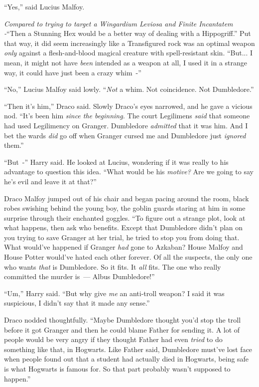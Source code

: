 ``Yes,'' said Lucius Malfoy.

\emph{Compared to trying to target a Wingardium Leviosa and Finite Incantatem -}``Then a Stunning Hex would be a better way of dealing with a Hippogriff.'' Put that way, it did seem increasingly like a Transfigured rock was an optimal weapon \emph{only} against a flesh-and-blood magical creature with spell-resistant skin. ``But... I mean, it might not have \emph{been} intended as a weapon at all, I used it in a strange way, it could have just been a crazy whim~-''

``No,'' Lucius Malfoy said lowly. ``\emph{Not} a whim. Not coincidence. Not Dumbledore.''

``Then it's him,'' Draco said. Slowly Draco's eyes narrowed, and he gave a vicious nod. ``It's been him \emph{since the beginning.} The court Legilimens \emph{said} that someone had used Legilimency on Granger. Dumbledore \emph{admitted} that it was him. And I bet the wards \emph{did} go off when Granger cursed me and Dumbledore just \emph{ignored} them.''

``But~-'' Harry said. He looked at Lucius, wondering if it was really to his advantage to question this idea. ``What would be his \emph{motive?} Are we going to say he's evil and leave it at that?''

Draco Malfoy jumped out of his chair and began pacing around the room, black robes swishing behind the young boy, the goblin guards staring at him in some surprise through their enchanted goggles. ``To figure out a strange plot, look at what happens, then ask who benefits. Except that Dumbledore didn't plan on you trying to save Granger at her trial, he tried to stop you from doing that. What would've happened if Granger \emph{had} gone to Azkaban? House Malfoy and House Potter would've hated each other forever. Of all the suspects, the only one who wants \emph{that} is Dumbledore. So it fits. It \emph{all} fits. The one who really committed the murder is~--- Albus Dumbledore!''

``Um,'' Harry said. ``But why give \emph{me} an anti-troll weapon? I said it was suspicious, I didn't say that it made any sense.''

Draco nodded thoughtfully. ``Maybe Dumbledore thought you'd stop the troll before it got Granger and then he could blame Father for sending it. A lot of people would be very angry if they thought Father had even \emph{tried} to do something like that, in Hogwarts. Like Father said, Dumbledore must've lost face when people found out that a student had actually died in Hogwarts, being safe is what Hogwarts is famous for. So that part probably wasn't supposed to happen.''

